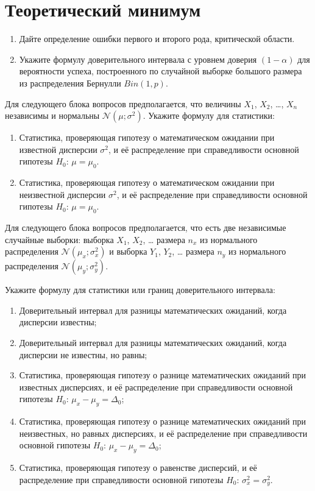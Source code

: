 \documentclass[12pt]{article}
\def \cN{\mathcal{N}}
\begin{document}
\section{Теоретический минимум}


\begin{enumerate}
  \item Дайте определение ошибки первого и второго рода, критической области.
  \item Укажите формулу доверительного интервала с уровнем доверия $(1-\alpha)$ для вероятности успеха, построенного по случайной выборке большого размера из распределения Бернулли $Bin(1, p)$.
\end{enumerate}

Для следующего блока вопросов предполагается, что величины $X_1$, $X_2$, \ldots, $X_n$ независимы и нормальны $\cN(\mu;\sigma^2)$.
Укажите формулу для статистики:

\begin{enumerate}[resume]
  \item Статистика, проверяющая гипотезу о математическом ожидании при известной дисперсии $\sigma^2$,
    и её распределение при справедливости основной гипотезы  $H_0$: $\mu = \mu_0$.
  \item Статистика, проверяющая гипотезу о математическом ожидании при неизвестной дисперсии $\sigma^2$,
    и её распределение при справедливости основной гипотезы  $H_0$: $\mu = \mu_0$.
\end{enumerate}


Для следующего блока вопросов предполагается, что есть две независимые случайные выборки:
выборка $X_1$, $X_2$, \ldots{ }размера $n_x$ из нормального распределения $\cN(\mu_x;\sigma^2_x)$
и выборка $Y_1$, $Y_2$, \ldots{ }размера $n_y$ из нормального распределения $\cN(\mu_y;\sigma^2_y)$.

Укажите формулу для статистики или границ доверительного интервала:

\begin{enumerate}[resume]
  \item Доверительный интервал для разницы математических ожиданий, когда дисперсии известны;
  \item Доверительный интервал для разницы математических ожиданий, когда дисперсии не известны, но равны;
  \item Статистика, проверяющая гипотезу о разнице математических ожиданий при известных дисперсиях,
    и её распределение при справедливости основной гипотезы $H_0$: $\mu_x - \mu_y = \Delta_0$;
  \item Статистика, проверяющая гипотезу о разнице математических ожиданий при неизвестных, но равных дисперсиях,
    и её распределение при справедливости основной гипотезы $H_0$: $\mu_x - \mu_y = \Delta_0$;
  \item Статистика, проверяющая гипотезу о равенстве дисперсий,
    и её распределение при справедливости основной гипотезы $H_0$: $\sigma^2_x = \sigma^2_y$.
\end{enumerate}
\end{document}
